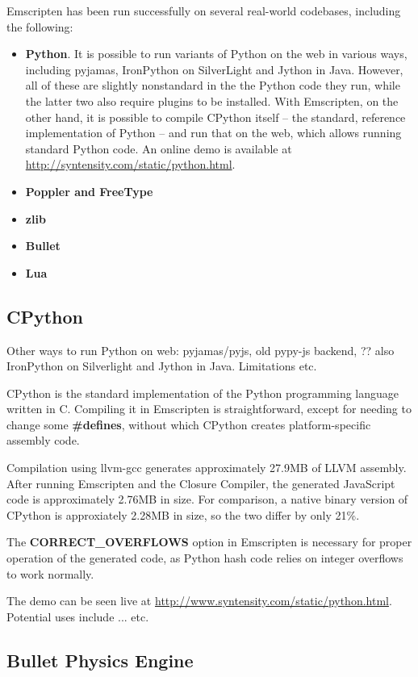 \documentclass[11pt]{proc}
\begin{document}
Emscripten has been run successfully on several real-world codebases, including
the following:
\begin{itemize}
\item \textbf{Python}. It is possible to run variants of Python on
the web in various ways, including pyjamas, IronPython on SilverLight and
Jython in Java. However, all of these are slightly nonstandard in the
the Python code they run, while the latter two also require plugins to be
installed. With Emscripten, on the other hand, it is possible to compile
CPython itself -- the standard, reference implementation of Python -- and
run that on the web, which allows running standard Python code. An online
demo is available at \url{http://syntensity.com/static/python.html}.
\item \textbf{Poppler and FreeType}
\item \textbf{zlib}
\item \textbf{Bullet}
\item \textbf{Lua}
\end{itemize}

\subsection{CPython}

Other ways to run Python on web: pyjamas/pyjs, old pypy-js backend, ?? also
IronPython on Silverlight and Jython in Java. Limitations etc.

CPython is the standard implementation of the Python programming language written
in C. Compiling it in Emscripten is straightforward, except for needing to
change some \textbf{\#defines}, without which CPython creates platform-specific assembly code.

Compilation using llvm-gcc generates approximately 27.9MB of LLVM assembly. After
running Emscripten and the Closure Compiler, the generated JavaScript code is
approximately 2.76MB in size. For comparison, a native binary version of
CPython is approxiately 2.28MB in size, so the two differ by only 21\%.

The \textbf{CORRECT\_OVERFLOWS} option in Emscripten is necessary for proper
operation of the generated code, as Python hash code relies on integer overflows
to work normally.

The demo can be seen live at \url{http://www.syntensity.com/static/python.html}.
Potential uses include ... etc.

\subsection{Bullet Physics Engine}
\end{document}
